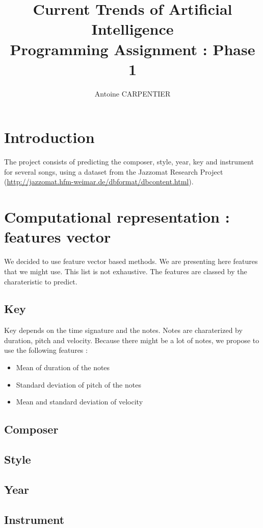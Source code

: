 \documentclass[a4paper,12pt]{article}
\author{Antoine CARPENTIER}
\title{Current Trends of Artificial Intelligence\\ \small Programming Assignment : Phase 1}
\begin{document}
\maketitle

\section{Introduction}

The project consists of predicting the composer, style, year, key and instrument for several songs, using a dataset from the Jazzomat Research Project (\url{http://jazzomat.hfm-weimar.de/dbformat/dbcontent.html}).

\section{Computational representation : features vector}

We decided to use feature vector based methods. We are presenting here features that we might use. This list is not exhaustive. The features are classed by the charateristic to predict.

\subsection{Key}

Key depends on the time signature and the notes. Notes are charaterized by duration, pitch and velocity. Because there might be a lot of notes, we propose to use the following features :

\begin{itemize}
    \item Mean of duration of the notes
    \item Standard deviation of pitch of the notes
    \item Mean and standard deviation of velocity
\end{itemize}

\subsection{Composer}

\subsection{Style}

\subsection{Year}

\subsection{Instrument}


\end{document}
